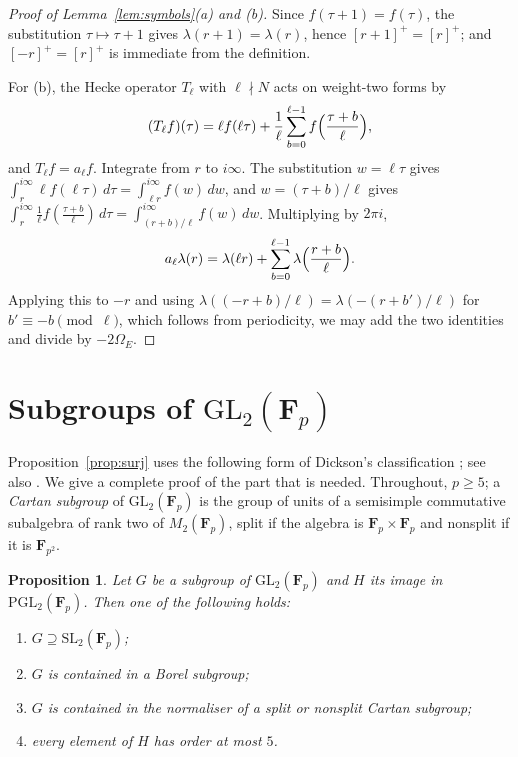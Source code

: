 \documentclass[11pt]{amsart}
\newtheorem{proposition}[theorem]{Proposition}
\theoremstyle{definition}
\newcommand{\F}{\mathbf{F}}
\newcommand{\GL}{\mathrm{GL}}
\newcommand{\SL}{\mathrm{SL}}
\newcommand{\PGL}{\mathrm{PGL}}
\begin{document}
\begin{proof}[Proof of Lemma~\ref{lem:symbols}(a) and (b)]
Since $f(\tau+1)=f(\tau)$, the substitution $\tau\mapsto\tau+1$ gives $\lambda(r+1)=\lambda(r)$, hence $[r+1]^+=[r]^+$; and $[-r]^+=[r]^+$ is immediate from the definition.

For (b), the Hecke operator $T_\ell$ with $\ell\nmid N$ acts on weight-two forms by
\[
(T_\ell f)(\tau)=\ell f(\ell\tau)+\frac1\ell\sum_{b=0}^{\ell-1}f\Bigl(\frac{\tau+b}{\ell}\Bigr),
\]
and $T_\ell f=a_\ell f$. Integrate from $r$ to $i\infty$. The substitution $w=\ell\tau$ gives $\int_r^{i\infty}\ell f(\ell\tau)\,d\tau=\int_{\ell r}^{i\infty}f(w)\,dw$, and $w=(\tau+b)/\ell$ gives $\int_r^{i\infty}\frac1\ell f(\frac{\tau+b}\ell)\,d\tau=\int_{(r+b)/\ell}^{i\infty}f(w)\,dw$. Multiplying by $2\pi i$,
\[
a_\ell\lambda(r)=\lambda(\ell r)+\sum_{b=0}^{\ell-1}\lambda\Bigl(\frac{r+b}{\ell}\Bigr).
\]
Applying this to $-r$ and using $\lambda((-r+b)/\ell)=\lambda(-(r+b')/\ell)$ for $b'\equiv-b\pmod\ell$, which follows from periodicity, we may add the two identities and divide by $-2\Omega_E$.
\end{proof}

\section{Subgroups of \texorpdfstring{$\GL_2(\F_p)$}{GL2(Fp)}}\label{app:dickson}

Proposition~\ref{prop:surj} uses the following form of Dickson's classification \cite{Dic01}; see also \cite[\S2]{Ser72}. We give a complete proof of the part that is needed. Throughout, $p\ge5$; a \emph{Cartan subgroup} of $\GL_2(\F_p)$ is the group of units of a semisimple commutative subalgebra of rank two of $M_2(\F_p)$, split if the algebra is $\F_p\times\F_p$ and nonsplit if it is $\F_{p^2}$.

\begin{proposition}\label{prop:dickson}
Let $G$ be a subgroup of $\GL_2(\F_p)$ and $H$ its image in $\PGL_2(\F_p)$. Then one of the following holds:
\begin{enumerate}
\item[(a)] $G\supseteq\SL_2(\F_p)$;
\item[(b)] $G$ is contained in a Borel subgroup;
\item[(c)] $G$ is contained in the normaliser of a split or nonsplit Cartan subgroup;
\item[(d)] every element of $H$ has order at most $5$.
\end{enumerate}
\end{proposition}
\end{document}
